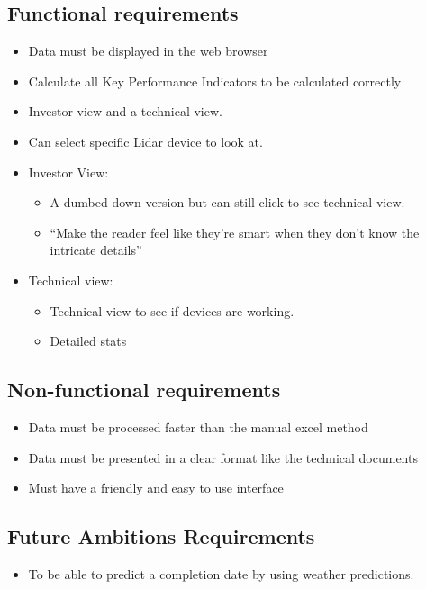 \documentclass{article}
\begin{document}
\begin{multicols}{2}
    \subsection{Functional requirements}
    \begin{itemize}
        \item Data must be displayed in the web browser 
        \item Calculate all Key Performance Indicators to be calculated correctly 
        \item Investor view and a technical view. 
        \item Can select specific Lidar device to look at. 
        \item Investor View: 
        \begin{itemize}
            \item A dumbed down version but can still click to see technical view. 
            \item “Make the reader feel like they’re smart when they don’t know the intricate details” 
        \end{itemize}
        \item Technical view: 
            \begin{itemize}
                \item Technical view to see if devices are working. 
                \item Detailed stats 
            \end{itemize}
    \end{itemize}
    \subsection{Non-functional requirements}
    \begin{itemize}
        \item Data must be processed faster than the manual excel method 
        \item Data must be presented in a clear format like the technical documents 
        \item Must have a friendly and easy to use interface  
    \end{itemize}
    \subsection{Future Ambitions Requirements}
    \begin{itemize}
        \item To be able to predict a completion date by using weather predictions.
    \end{itemize}

\end{multicols}
\end{document}
